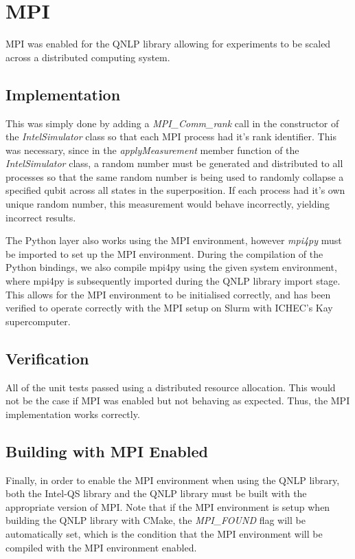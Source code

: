 \section{MPI}
\label{sec:MPI}
MPI was enabled for the QNLP library allowing for experiments to be scaled across a distributed computing system. 

\subsection{Implementation}
\label{sec:Enabling_MPI__Implmentation}
This was simply done by adding a \textit{MPI\_Comm\_rank} call in the constructor of the \textit{IntelSimulator} class so that each MPI process had it's rank identifier. This was necessary, since in the \textit{applyMeasurement} member function of the \textit{IntelSimulator} class, a random number must be generated and distributed to all processes so that the same random number is being used to randomly collapse a specified qubit across all states in the superposition. If each process had it's own unique random number, this measurement would behave incorrectly, yielding incorrect results.

The Python layer also works using the MPI environment, however \textit{mpi4py} must be imported to set up the MPI environment. During the compilation of the Python bindings, we also compile mpi4py using the given system environment, where mpi4py is subsequently imported during the QNLP library import stage. This allows for the MPI environment to be initialised correctly, and has been verified to operate correctly with the MPI setup on Slurm with ICHEC's Kay supercomputer.

\subsection{Verification}
\label{sec:Enabling_MPI__Verification}
All of the unit tests passed using a distributed resource allocation. This would not be the case if MPI was enabled but not behaving as expected. Thus, the MPI implementation works correctly.

\subsection{Building with MPI Enabled}
\label{sec:Enabling_MPI__Building_with_MPI_Enabled}
Finally, in order to enable the MPI environment when using the QNLP library, both the Intel\textregistered-QS library and the QNLP library must be built with the appropriate version of MPI. Note that if the MPI environment is setup when building the QNLP library with CMake, the \textit{MPI\_FOUND} flag will be automatically set, which is the condition that the MPI environment will be compiled with the MPI environment enabled.

